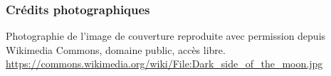 
\newpage
\subsubsection*{Crédits photographiques}
Photographie de l'image de couverture reproduite avec permission depuis
Wikimedia Commons, domaine public, accès libre.\\
\url{https://commons.wikimedia.org/wiki/File:Dark_side_of_the_moon.jpg}
\newpage

\afterpage{\blankpage}
\tableofcontents
\vfill
{}
\newpage
\printacronyms[include-classes=abbrev,name=Abbréviations]
\newpage

\setcounter{page}{1}
